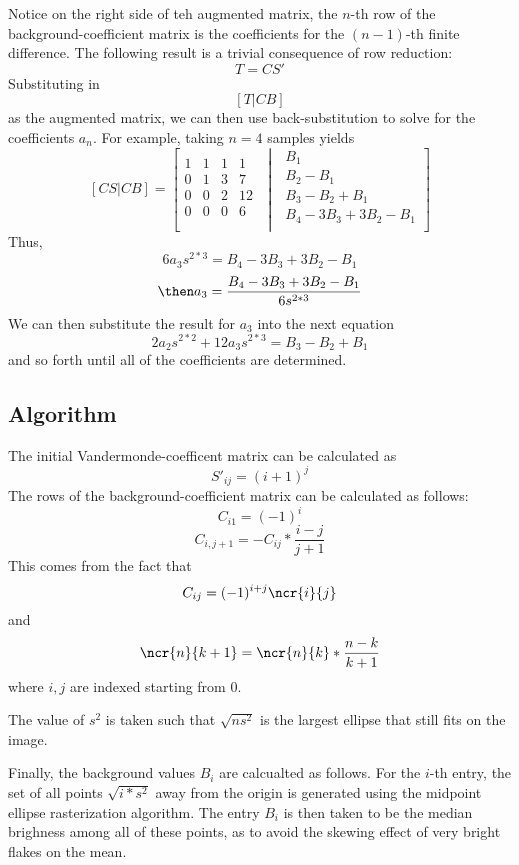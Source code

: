 \documentclass{article}
\begin{document}
Notice on the right side of teh augmented matrix, the \(n\)-th row of the background-coefficient matrix is the coefficients for the \((n-1)\)-th finite difference.
The following result is a trivial consequence of row reduction:
\[T=CS'\]
Substituting in
\[[T|CB]\]
as the augmented matrix, we can then use back-substitution to solve for the coefficients \(a_n\). For example, taking \(n=4\) samples yields
\[
	[CS\vert CB]=\left[\begin{matrix} 1 & 1 & 1 & 1\\
			0 & 1 & 3 & 7\\
			0 & 0 & 2 & 12\\
			0 & 0 & 0 & 6\\
		\end{matrix}
		\,\,\middle\vert\,\,\begin{matrix}
			B_1\\
			B_2-B_1\\
			B_3-B_2+B_1\\
			B_4-3B_3+3B_2-B_1\\
	\end{matrix}\right]
		\]
Thus,
\[6a_3 s^{2*3}= B_4-3B_3+3B_2-B_1\]
\[\then a_3 = \frac{B_4-3B_3+3B_2-B_1}{6s^{2*3}}\]
We can then substitute the result for \(a_3\) into the next equation
\[2a_2 s^{2*2}+12a_3s^{2*3} = B_3-B_2+B_1\]
and so forth until all of the coefficients are determined.

\subsection{Algorithm}
The initial Vandermonde-coefficent matrix can be calculated as
\[S'_{ij}=(i+1)^{j}\]
The rows of the background-coefficient matrix can be calculated as follows:
\[C_{i1}=(-1)^i\]
\[C_{i,j+1}=-C_{ij}*\frac{i-j}{j+1}\]
This comes from the fact that
\[C_{ij}=(-1)^{i+j}\ncr{i}{j}\]
and
\[\ncr{n}{k+1}=\ncr{n}{k}*\frac{n-k}{k+1}\]
where \(i,j\) are indexed starting from \(0\).

The value of \(s^2\) is taken such that \(\sqrt{ns^2}\) is the largest ellipse that still fits on the image. 

Finally, the background values \(B_i\) are calcualted as follows. For the \(i\)-th entry, the set of all points \(\sqrt{i*s^2}\) away from the origin is generated using the midpoint ellipse rasterization algorithm. The entry \(B_i\) is then taken to be the median brighness among all of these points, as to avoid the skewing effect of very bright flakes on the mean.
\end{document}
